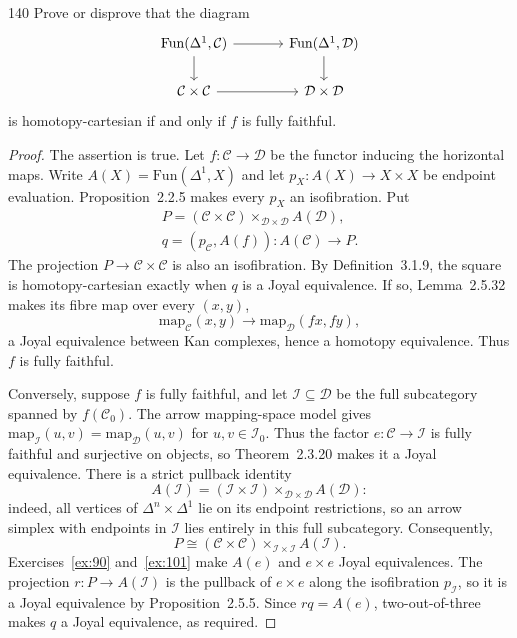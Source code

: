 \begin{exercise}{140}
Prove or disprove that the diagram
\[
\begin{tikzcd}[column sep=large]
 \mathrm{Fun}(\Delta^1,\mathcal C) \arrow[r] \arrow[d]
   & \mathrm{Fun}(\Delta^1,\mathcal D) \arrow[d] \\
 \mathcal C\times\mathcal C \arrow[r]
   & \mathcal D\times\mathcal D
\end{tikzcd}
\]
is homotopy-cartesian if and only if $f$ is fully faithful.

\begin{proof}
The assertion is true. Let $f\colon\mathcal C\to\mathcal D$ be the
functor inducing the horizontal maps.
Write $A(X)=\mathrm{Fun}(\Delta^1,X)$ and let
$p_X\colon A(X)\to X\times X$ be endpoint evaluation.
Proposition~2.2.5 makes every $p_X$ an isofibration. Put
\[
 \begin{gathered}
 P=(\mathcal C\times\mathcal C)
       \times_{\mathcal D\times\mathcal D}A(\mathcal D),\\
 q=(p_{\mathcal C},A(f))\colon A(\mathcal C)\longrightarrow P.
 \end{gathered}
\]
The projection $P\to\mathcal C\times\mathcal C$ is also an
isofibration. By Definition~3.1.9, the square is homotopy-cartesian
exactly when $q$ is a Joyal equivalence.
If so, Lemma~2.5.32 makes its fibre map over every $(x,y)$,
\[
 \mathrm{map}_{\mathcal C}(x,y)\longrightarrow
 \mathrm{map}_{\mathcal D}(fx,fy),
\]
a Joyal equivalence between Kan complexes, hence a homotopy
equivalence. Thus $f$ is fully faithful.

Conversely, suppose $f$ is fully faithful, and let
$\mathcal I\subseteq\mathcal D$ be the full subcategory spanned by
$f(\mathcal C_0)$.
The arrow mapping-space model gives
$\mathrm{map}_{\mathcal I}(u,v)=\mathrm{map}_{\mathcal D}(u,v)$
for $u,v\in\mathcal I_0$.
Thus the factor $e\colon\mathcal C\to\mathcal I$ is fully faithful
and surjective on objects, so Theorem~2.3.20 makes it a Joyal
equivalence.
There is a strict pullback identity
\[
 A(\mathcal I)=(\mathcal I\times\mathcal I)
       \times_{\mathcal D\times\mathcal D}A(\mathcal D):
\]
indeed, all vertices of $\Delta^n\times\Delta^1$ lie on its endpoint
restrictions, so an arrow simplex with endpoints in $\mathcal I$
lies entirely in this full subcategory.
Consequently,
\[
 P\cong(\mathcal C\times\mathcal C)
       \times_{\mathcal I\times\mathcal I}A(\mathcal I).
\]
Exercises~\ref{ex:90} and~\ref{ex:101} make $A(e)$ and $e\times e$
Joyal equivalences.
The projection $r\colon P\to A(\mathcal I)$ is the pullback of
$e\times e$ along the isofibration $p_{\mathcal I}$, so it is a
Joyal equivalence by Proposition~2.5.5.
Since $rq=A(e)$, two-out-of-three makes $q$ a Joyal equivalence,
as required.
\end{proof}
\end{exercise}
